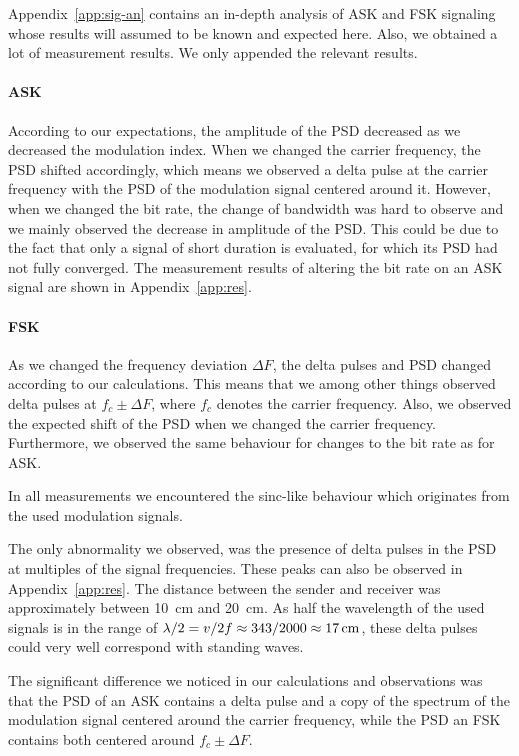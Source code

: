\documentclass[11pt,titlepage]{report}
\begin{document}
Appendix~\ref{app:sig-an} contains an in-depth analysis of ASK and FSK signaling whose results will assumed to be known and expected here. Also, we obtained a lot of measurement results. We only appended the relevant results.

\paragraph{ASK} According to our expectations, the amplitude of the PSD decreased as we decreased the modulation index. When we changed the carrier frequency, the PSD shifted accordingly, which means we observed a delta pulse at the carrier frequency with the PSD of the modulation signal centered around it. However, when we changed the bit rate, the change of bandwidth was hard to observe and we mainly observed the decrease in amplitude of the PSD. This could be due to the fact that only a signal of short duration is evaluated, for which its PSD had not fully converged. The measurement results of altering the bit rate on an ASK signal are shown in Appendix~\ref{app:res}.

\paragraph{FSK} As we changed the frequency deviation $\Delta F$, the delta pulses and PSD changed according to our calculations. This means that we among other things observed delta pulses at $f_c\pm \Delta F$, where $f_c$ denotes the carrier frequency. Also, we observed the expected shift of the PSD when we changed the carrier frequency. Furthermore, we observed the same behaviour for changes to the bit rate as for ASK.

In all measurements we encountered the sinc-like behaviour which originates from the used modulation signals.

The only abnormality we observed, was the presence of delta pulses in the PSD at multiples of the signal frequencies. These peaks can also be observed in Appendix~\ref{app:res}. The distance between the sender and receiver was approximately between \SI{10}{cm} and \SI{20}{cm}. As half the wavelength of the used signals is in the range of $\lambda/2=v/2f\approx 343/2000\approx\text{\SI{17}{cm}}$, these delta pulses could very well correspond with standing waves.

The significant difference we noticed in our calculations and observations was that the PSD of an ASK contains a delta pulse and a copy of the spectrum of the modulation signal centered around the carrier frequency, while the PSD an FSK contains both centered around $f_c\pm \Delta F$.
\end{document}
